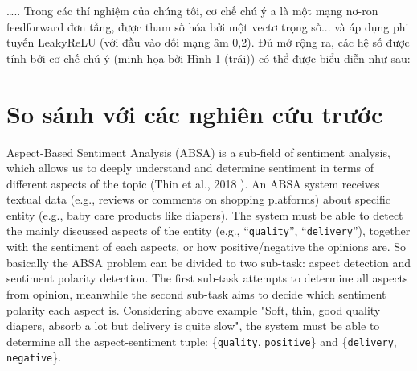 …..
Trong các thí nghiệm của chúng tôi, cơ chế chú ý a là một mạng nơ-ron feedforward đơn tầng, được tham số hóa bởi một vectơ trọng số... và áp dụng phi tuyến LeakyReLU (với đầu vào dối mạng âm  0,2). Đủ mở rộng ra, các hệ số được tính bởi cơ chế chú ý (minh họa bởi Hình 1 (trái)) có thể được biểu diễn như sau:



\section{So sánh với các nghiên cứu trước}

Aspect-Based Sentiment Analysis (ABSA) is a sub-field of sentiment analysis, which allows us to deeply understand and determine sentiment in terms of different aspects of the topic (Thin et al., 2018 \cite{van2018transformation}). An ABSA system receives textual data (e.g., reviews or comments on shopping platforms) about specific entity (e.g., baby care products like diapers). The system must be able to detect the mainly discussed aspects of the entity (e.g., ``\texttt{quality}'', ``\texttt{delivery}''), together with the sentiment of each aspects, or how positive/negative the opinions are. So basically the ABSA problem can be divided to two sub-task: aspect detection and sentiment polarity detection. The first sub-task attempts to determine all aspects from opinion, meanwhile the second sub-task aims to decide which sentiment polarity each aspect is. Considering above example "Soft, thin, good quality diapers, absorb a lot but delivery is quite slow", the system must be able to determine all the aspect-sentiment tuple: \{\texttt{quality}, \texttt{positive}\} and \{\texttt{delivery}, \texttt{negative}\}.




